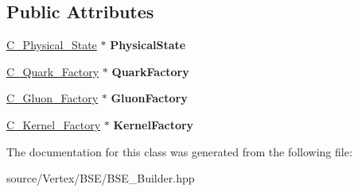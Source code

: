 \subsection*{Public Attributes}
\begin{DoxyCompactItemize}
\item 
\hypertarget{class_c___b_s_e___abstract___builder_a95bb89c8179deb6efd51aa5a994f751f}{\hyperlink{class_c___physical___state}{C\-\_\-\-Physical\-\_\-\-State} $\ast$ {\bfseries Physical\-State}}\label{class_c___b_s_e___abstract___builder_a95bb89c8179deb6efd51aa5a994f751f}

\item 
\hypertarget{class_c___b_s_e___abstract___builder_a511633808f27815b4715bb3df2951b2a}{\hyperlink{class_c___quark___factory}{C\-\_\-\-Quark\-\_\-\-Factory} $\ast$ {\bfseries Quark\-Factory}}\label{class_c___b_s_e___abstract___builder_a511633808f27815b4715bb3df2951b2a}

\item 
\hypertarget{class_c___b_s_e___abstract___builder_a5043032a003b92e57ff8dd16e16b4677}{\hyperlink{class_c___gluon___factory}{C\-\_\-\-Gluon\-\_\-\-Factory} $\ast$ {\bfseries Gluon\-Factory}}\label{class_c___b_s_e___abstract___builder_a5043032a003b92e57ff8dd16e16b4677}

\item 
\hypertarget{class_c___b_s_e___abstract___builder_a8c94f78e1427657eac69b287e6599590}{\hyperlink{class_c___kernel___factory}{C\-\_\-\-Kernel\-\_\-\-Factory} $\ast$ {\bfseries Kernel\-Factory}}\label{class_c___b_s_e___abstract___builder_a8c94f78e1427657eac69b287e6599590}

\end{DoxyCompactItemize}


The documentation for this class was generated from the following file\-:\begin{DoxyCompactItemize}
\item 
source/\-Vertex/\-B\-S\-E/B\-S\-E\-\_\-\-Builder.\-hpp\end{DoxyCompactItemize}
